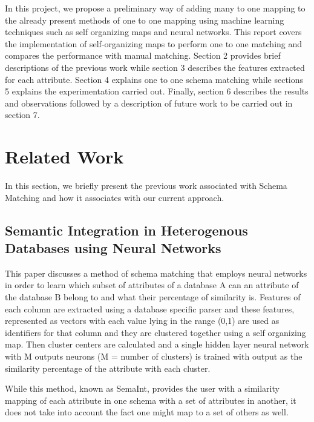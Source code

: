 \documentclass[conference]{IEEEtran}
\begin{document}
In this project, we propose a preliminary way of adding many to one mapping to the already present methods of one to one mapping using machine learning techniques such as self organizing maps and neural networks. This report covers the implementation of self-organizing maps to perform one to one matching and compares the performance with manual matching. Section 2 provides brief descriptions of the previous work while section 3 describes the features extracted for each attribute. Section 4 explains one to one schema matching while sections 5 explains the experimentation carried out. Finally, section 6 describes the results and observations followed by a description of future work to be carried out in section 7.


\section{Related Work}
In this section, we briefly present the previous work associated with Schema Matching and how it associates with our current approach.
\subsection{\textbf{Semantic Integration in Heterogenous Databases using Neural Networks}\cite{ref1}}
This paper discusses a method of schema matching that employs neural networks in order to learn which subset of attributes of a database A can an attribute of the database B belong to and what their percentage of similarity is. Features of each column are extracted using a database specific parser and these features, represented as vectors with each value lying in the range (0,1) are used as identifiers for that column and they are clustered together using a self organizing map. Then cluster centers are calculated and a single hidden layer neural network with M outputs neurons (M = number of clusters) is trained with output as the similarity percentage of the attribute with each cluster.

While this method, known as SemaInt, provides the user with a similarity mapping of each attribute in one schema with a set of attributes in another, it does not take into account the fact one might map to a set of others as well.
\end{document}
